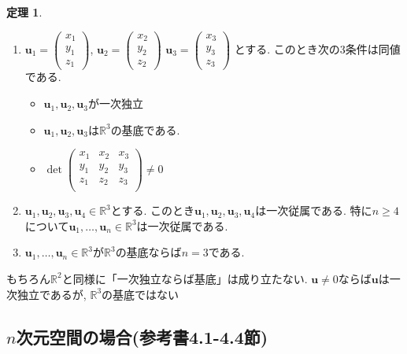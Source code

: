\documentclass[dvipdfmx,a4paper,11pt]{article}
\newcommand{\R}{\mathbb{R}}
\theoremstyle{definition}
\newtheorem{thm}{定理}
\begin{document}
\begin{tcolorbox}[
    colback = white,
    colframe = green!35!black,
    fonttitle = \bfseries,
    breakable = true]
    \begin{thm}
    \begin{enumerate}
	\setlength{\parskip}{0cm}
  	\setlength{\itemsep}{0pt} 
\item $\bm{u}_1 =   
\begin{pmatrix}
x_1\\  y_1\\ z_1
 \end{pmatrix} $, 
 $\bm{u}_2 =   
\begin{pmatrix}
x_2\\  y_2\\ z_2
 \end{pmatrix} $
  $\bm{u}_3 =   
\begin{pmatrix}
x_3\\  y_3\\ z_3
 \end{pmatrix} $
 とする. このとき次の3条件は同値である.
 \begin{itemize}
 \setlength{\parskip}{0cm}
  	\setlength{\itemsep}{0pt} 
 \item $\bm{u}_1, \bm{u}_2,  \bm{u}_3$が一次独立
  \item $\bm{u}_1, \bm{u}_2,  \bm{u}_3$は$\R^3$の基底である. 
\item  $\det 
 \begin{pmatrix}
x_1&x_2&x_3\\  
y_1&y_2&y_3\\ 
z_1&z_2&z_3\\
 \end{pmatrix} 
  \neq 0$
  \end{itemize}
 \item  $\bm{u}_1, \bm{u}_2, \bm{u}_3,  \bm{u}_4\in \R^3 $とする. このとき$\bm{u}_1, \bm{u}_2, \bm{u}_3, \bm{u}_4$は一次従属である. 特に$n \ge 4$について$\bm{u}_1, \ldots, \bm{u}_n \in \R^3$は一次従属である. 
 \item   $\bm{u}_1, \ldots, \bm{u}_n \in \R^3 $が$\R^3$の基底ならば$n=3$である. 
\end{enumerate}
    \end{thm}
 \end{tcolorbox}


もちろん$\R^2$と同様に「一次独立ならば基底」は成り立たない. 
$\bm{u}\neq 0$ならば$\bm{u}$は一次独立であるが, $\R^3$の基底ではない
 
 \subsection{$n$次元空間の場合(参考書4.1-4.4節)}
 
\end{document}
